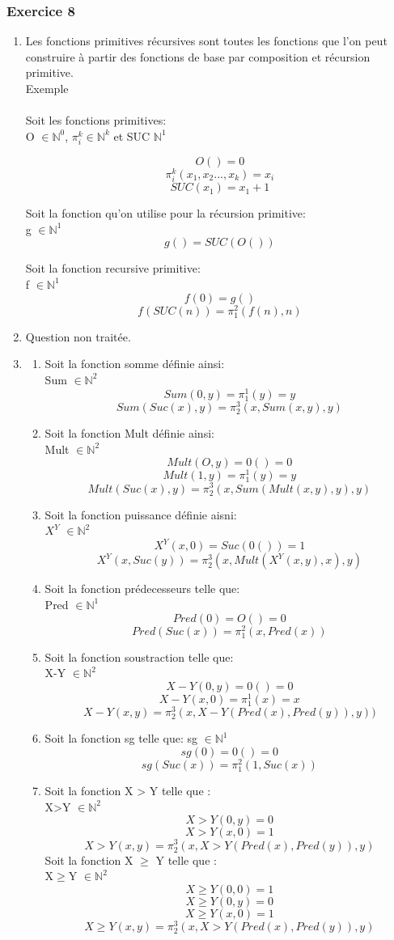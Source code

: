 \documentclass[]{article}
\begin{document}
\subsubsection{Exercice 8}
\begin{enumerate}
\item Les fonctions primitives récursives sont toutes les fonctions que l'on peut construire à partir des fonctions de base par composition et récursion primitive.\\

  Exemple\\ \\
Soit les fonctions primitives: \\
O $\in \mathbb{N}^0$, $\pi_i^k \in \mathbb{N}^k$ et SUC $\mathbb{N}^1$ 

 \[O() = 0 \] 
\[\pi_i^k(x_1,x_2...,x_k) = x_i \] 
\[SUC(x_1) = x_1 + 1 \] 

Soit la fonction qu'on utilise pour la récursion primitive:\\
g $\in \mathbb{N}^1$
\[g() = SUC(O()) \]

Soit la fonction recursive primitive:\\
f $\in \mathbb{N}^1$
\[f(0) = g()\]
\[f(SUC(n)) = \pi_1^2(f(n),n)\]
  
\item  Question non traitée.\\ 
\item \begin{enumerate}\item Soit la fonction somme définie ainsi:\\
 Sum $\in \mathbb{N}^2$ 
\[Sum(0,y) = \pi_1^1(y) = y \]
\[Sum(Suc(x),y) = \pi_2^3(x,Sum(x,y),y)\]
\item Soit la fonction Mult définie ainsi: \\
Mult $\in \mathbb{N}^2$
\[Mult(O,y) = 0() = 0\]
\[Mult(1,y) = \pi_1^1(y) = y\]
\[Mult(Suc(x),y) = \pi_2^3(x,Sum(Mult(x,y),y),y)\]
\item Soit la fonction puissance définie aisni:\\
 $X^Y$ $\in \mathbb{N}^2$
\[X^Y(x,0) = Suc(0()) = 1\]
\[X^Y(x,Suc(y)) = \pi_2^3(x,Mult(X^Y(x,y),x),y)\]
\item Soit la fonction prédecesseurs telle que: \\
Pred $\in \mathbb{N}^1$
\[Pred(0) = O() = 0\]
\[Pred(Suc(x)) = \pi_1^2(x,Pred(x))\]
\item Soit la fonction soustraction telle que:\\
X-Y $\in \mathbb{N}^2$
\[X-Y(0,y) = 0() = 0\]
\[X-Y(x,0) = \pi_1^1(x) = x\]
\[X-Y(x,y) = \pi_2^3(x,X-Y(Pred(x),Pred(y)),y))\]
\item Soit la fonction sg telle que:
sg $\in \mathbb{N}^1$
\[sg(0) = 0() = 0\]
\[sg(Suc(x)) = \pi_1^2(1,Suc(x))\]
\item Soit la fonction X > Y telle que :\\
X>Y $\in \mathbb{N}^2$
\[X>Y(0,y) = 0\]
\[X>Y(x,0) = 1\]
\[X>Y(x,y) = \pi_2^3(x,X>Y(Pred(x),Pred(y)),y)\]
Soit la fonction X $\ge$ Y telle que :\\
X$\ge$Y $\in \mathbb{N}^2$
\[X\ge Y(0,0) = 1\]
\[X\ge Y(0,y) = 0\]
\[X\ge Y(x,0) = 1\]
\[X\ge Y(x,y) = \pi_2^3(x,X>Y(Pred(x),Pred(y)),y)\]


\end{enumerate}
\end{enumerate}
\end{document}
